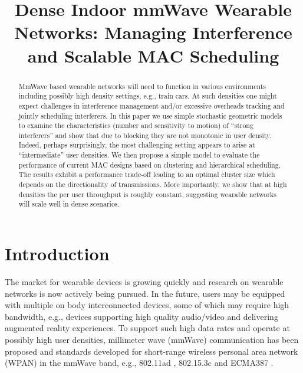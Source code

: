 \documentclass[10pt, conference, letterpaper]{IEEEtran}
\begin{document}
\title{Dense Indoor mmWave Wearable Networks: Managing Interference and Scalable MAC Scheduling}

\author{
}

\maketitle

\begin{abstract}

MmWave based wearable networks will need to function in various environments including possibly high density settings, e.g., train cars. 
At such densities one might expect challenges in interference management and/or excessive overheads tracking and jointly scheduling interferers. 
In this paper we use simple stochastic geometric models to examine the characteristics (number and sensitivity to motion) of ``strong interferers'' and show that due to blocking they are not monotonic in user density. 
Indeed, perhaps surprisingly, the most challenging setting appears to arise at ``intermediate'' user densities. 
We then propose a simple model to evaluate the performance of current MAC designs based on clustering and hierarchical scheduling. 
The results exhibit a performance trade-off leading to an optimal cluster size which depends on the directionality of transmissions. 
More importantly, we show that at high densities the per user throughput is roughly constant, suggesting wearable networks will scale well in dense scenarios.

\end{abstract}
\IEEEpeerreviewmaketitle

\section{Introduction}\label{section:introduction}
The market for wearable devices is growing quickly and research on wearable networks is now actively being pursued\cite{wearable}. 
In the future, users may be equipped with multiple on body interconnected devices, some of which may require high bandwidth, e.g., devices supporting high quality audio/video and delivering augmented reality experiences. 
To support such high data rates and operate at possibly high user densities, millimeter wave (mmWave) communication has been proposed and standards developed for short-range wireless personal area network (WPAN) in the mmWave band, e.g., 802.11ad \cite{80211ad}, 802.15.3c \cite{802153c} and ECMA387 \cite{ECMA387}.
\end{document}
